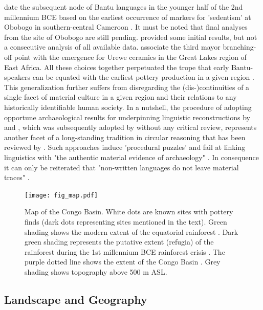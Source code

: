 \documentclass[smallextended,natbib]{svjour3}       %
\begin{document}
\citet[SI p.~2]{Grollemund.2015} date the subsequent node of Bantu languages in the younger half of the 2nd millennium BCE based on the earliest occurrence of markers for 'sedentism' at Obobogo in southern-central Cameroon \citep{deMaret.1982,deMaret.1983,deMaret.1992}. It must be noted that final analyses from the site of Obobogo are still pending. \citet{Claes.1985} provided some initial results, but not a consecutive analysis of all available data. \citet[SI p.~2]{Grollemund.2015} associate the third mayor branching-off point with the emergence for Urewe ceramics in the Great Lakes region of East Africa. All these choices together perpetuated the trope that early Bantu-speakers can be equated with the earliest pottery production in a given region \citep[355,362,364]{Bostoen.2015}. This generalization further suffers from disregarding the (dis-)continuities of a single facet of material culture in a given region and their relations to any historically identifiable human society. In a nutshell, the procedure of adopting opportune archaeological results for underpinning linguistic reconstructions by \citet{Grollemund.2015} and \citet{Bostoen.2015}, which was subsequently adopted by \citet[SI]{Koile.2022} without any critical review, represents another facet of a long-standing tradition in circular reasoning \citep{Ehret.1973,Phillipson.1976,Phillipson.1976b,Phillipson.1977a,Heine.1977} that has been reviewed by \citet[82]{Eggert.2005,Eggert.2016a}. Such approaches induce 'procedural puzzles' and fail at linking linguistics with "the authentic material evidence of archaeology" \citep[88]{Eggert.2016a}. In consequence it can only be reiterated that "non-written languages do not leave material traces" \citep[85]{Eggert.2016a}.

\begin{figure}[!tb]
	\texttt{[image: fig\_map.pdf]}
	\caption{Map of the Congo Basin. White dots are known sites with pottery finds (dark dots representing sites mentioned in the text). Green shading shows the modern extent of the equatorial rainforest \citep{White.1983}. Dark green shading represents the putative extent (refugia) of the rainforest during the 1st millennium BCE rainforest crisis \citep{Bremond.2017,Maley.2017}. The purple dotted line shows the extent of the Congo Basin \citep[11]{Runge.2001}. Grey shading shows topography above 500 m ASL.}
	\label{fig:map}
\end{figure}

\subsection*{Landscape and Geography}
\end{document}
